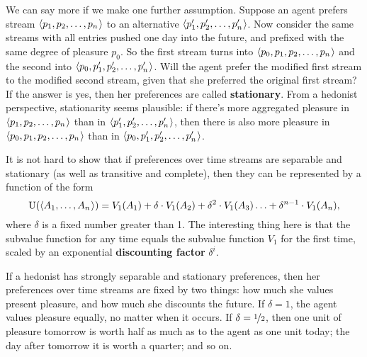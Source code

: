 We can say more if we make one further assumption. Suppose an agent prefers
stream $\t{p_1,p_2,\ldots,p_n}$ to an alternative $\t{p_1',p_2',\ldots,p_n'}$.
Now consider the same streams with all entries pushed one day into the future,
and prefixed with the same degree of pleasure $p_0$. So the first stream turns
into $\t{p_0, p_1,p_2,\ldots,p_n}$ and the second into
$\t{p_0, p_1',p_2',\ldots,p_n'}$. Will the agent prefer the modified first
stream to the modified second stream, given that she preferred the original
first stream? If the answer is yes, then her preferences are called
\textbf{stationary}. From a hedonist perspective, stationarity seems plausible:
if there's more aggregated pleasure in $\t{p_1,p_2,\ldots,p_n}$ than in
$\t{p_1',p_2',\ldots,p_n'}$, then there is also more pleasure in
$\t{p_0,p_1,p_2,\ldots,p_n}$ than in $\t{p_0,p_1',p_2',\ldots,p_n'}$.

It is not hard to show that if preferences over time streams are separable and
stationary (as well as transitive and complete), then they can be represented by
a function of the form
\[
\U(\t{A_1,\ldots,A_n}) = V_1(A_1) + \delta \cdot V_1(A_2) +
\delta^2 \cdot V_1(A_3) \ldots + \delta^{n-1} \cdot V_1(A_n),
\]
where $\delta$ is a fixed number greater than 1. The interesting thing here is
that the subvalue function for any time equals the subvalue function $V_1$ for
the first time, scaled by an exponential \textbf{discounting factor} $\delta^i$.


If a hedonist has strongly separable and stationary preferences, then her
preferences over time streams are fixed by two things: how much she values
present pleasure, and how much she discounts the future. If $\delta = 1$, the
agent values pleasure equally, no matter when it occurs. If
$\delta = \nicefrac{1}{2}$, then one unit of pleasure tomorrow is worth half as
much as to the agent as one unit today; the day after tomorrow it is worth a
quarter; and so on.

